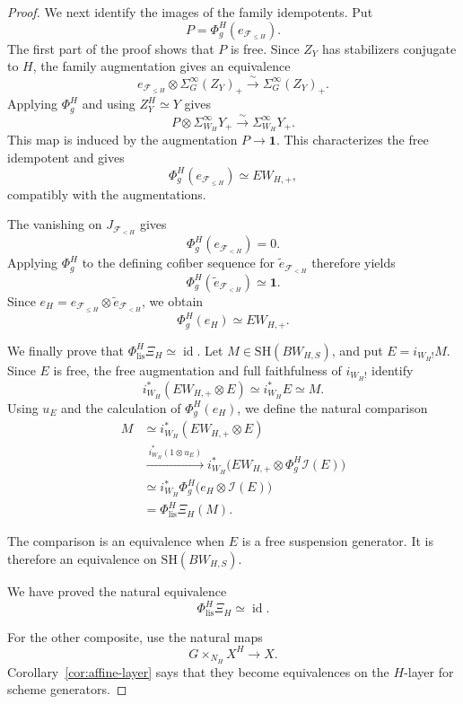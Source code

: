 \documentclass[11pt,reqno]{amsart}
\theoremstyle{definition}
\theoremstyle{remark}
\theoremstyle{plain}
\numberwithin{equation}{section}
\newcommand{\SH}{\mathrm{SH}}
\newcommand{\one}{\mathbf 1}
\newcommand{\lis}{\mathrm{lis}}
\newcommand{\F}{\mathcal F}
\begin{document}
\begin{proof}
We next identify the images of the family idempotents.
Put
\[
 P=\Phi_g^H(e_{\F_{\leq H}}).
\]
The first part of the proof shows that \(P\) is free.
Since \(Z_Y\) has stabilizers conjugate to \(H\), the family
augmentation gives an equivalence
\[
 e_{\F_{\leq H}}\otimes\Sigma^\infty_G(Z_Y)_+
 \xrightarrow{\sim}
 \Sigma^\infty_G(Z_Y)_+.
\]
Applying \(\Phi_g^H\) and using \(Z_Y^H\simeq Y\) gives
\[
 P\otimes\Sigma^\infty_{W_H}Y_+
 \xrightarrow{\sim}
 \Sigma^\infty_{W_H}Y_+.
\]
This map is induced by the augmentation \(P\to\one\).
This characterizes the free idempotent and gives
\[
 \Phi_g^H(e_{\F_{\leq H}})\simeq EW_{H,+},
\]
compatibly with the augmentations.

The vanishing on \(J_{\F_{<H}}\) gives
\[
 \Phi_g^H(e_{\F_{<H}})=0.
\]
Applying \(\Phi_g^H\) to the defining cofiber sequence for
\(\widetilde e_{\F_{<H}}\) therefore yields
\[
 \Phi_g^H(\widetilde e_{\F_{<H}})\simeq\one.
\]
Since
\(e_H=e_{\F_{\leq H}}\otimes\widetilde e_{\F_{<H}}\),
we obtain
\[
 \Phi_g^H(e_H)\simeq EW_{H,+}.
\]

We finally prove that
\(\Phi_{\lis}^H\Xi_H\simeq\operatorname{id}\).
Let \(M\in\SH(BW_{H,S})\), and put \(E=i_{W_H!}M\).
Since \(E\) is free, the free augmentation and full faithfulness
of \(i_{W_H!}\) identify
\[
 i_{W_H}^*(EW_{H,+}\otimes E)
 \simeq i_{W_H}^*E
 \simeq M.
\]
Using \(u_E\) and the calculation of \(\Phi_g^H(e_H)\),
we define the natural comparison
\[
 \begin{aligned}
 M
 &\simeq i_{W_H}^*(EW_{H,+}\otimes E)\\
 &\xrightarrow{\ i_{W_H}^*(1\otimes u_E)\ }
 i_{W_H}^*
 \bigl(EW_{H,+}\otimes\Phi_g^H\mathcal I(E)\bigr)\\
 &\simeq
 i_{W_H}^*\Phi_g^H
 \bigl(e_H\otimes\mathcal I(E)\bigr)\\
 &=\Phi_{\lis}^H\Xi_H(M).
 \end{aligned}
\]

The comparison is an equivalence when \(E\) is a free suspension
generator.
It is therefore an equivalence on \(\SH(BW_{H,S})\).

We have proved the natural equivalence
\[
 \Phi_{\lis}^H\Xi_H\simeq\operatorname{id}.
\]

For the other composite, use the natural maps
\[
 G\times_{N_H}X^H\longrightarrow X.
\]
Corollary~\ref{cor:affine-layer} says that they become
equivalences on the \(H\)-layer for scheme generators.


\end{proof}
\end{document}
